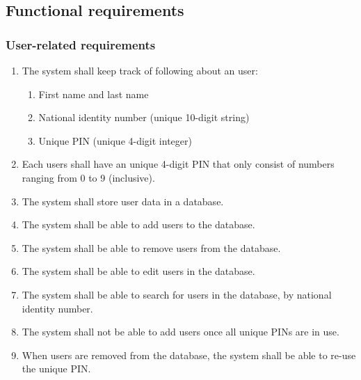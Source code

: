 \documentclass[12pt,titlepage,bibliography=totoc]{article}
\begin{document}
\subsection{Functional requirements}
\subsubsection{User-related requirements}
\begin{enumerate}
	\item The system shall keep track of following about an user:
	\begin{enumerate}
		\item First name and last name
		\item National identity number (unique 10-digit string)
		\item Unique PIN (unique 4-digit integer)
	\end{enumerate}
	\item Each users shall have an unique 4-digit PIN that only consist of numbers ranging from 0 to 9 (inclusive).
	\item The system shall store user data in a database.
	\item The system shall be able to add users to the database.
	\item The system shall be able to remove users from the database.
	\item The system shall be able to edit users in the database.
	\item The system shall be able to search for users in the database, by national identity number.
	\item The system shall not be able to add users once all unique PINs are in use.
	\item When users are removed from the database, the system shall be able to re-use the unique PIN.
\end{enumerate}
\end{document}
